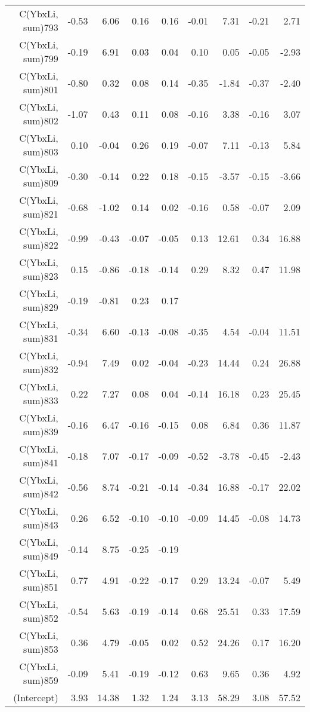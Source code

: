 \begin{table}[p]
\begin{tabular}{rrrrrrrrr}
  C(YbxLi, sum)793 & -0.53 & 6.06 & 0.16 & 0.16 & -0.01 & 7.31 & -0.21 & 2.71 \\ 
  C(YbxLi, sum)799 & -0.19 & 6.91 & 0.03 & 0.04 & 0.10 & 0.05 & -0.05 & -2.93 \\ 
  C(YbxLi, sum)801 & -0.80 & 0.32 & 0.08 & 0.14 & -0.35 & -1.84 & -0.37 & -2.40 \\ 
  C(YbxLi, sum)802 & -1.07 & 0.43 & 0.11 & 0.08 & -0.16 & 3.38 & -0.16 & 3.07 \\ 
  C(YbxLi, sum)803 & 0.10 & -0.04 & 0.26 & 0.19 & -0.07 & 7.11 & -0.13 & 5.84 \\ 
  C(YbxLi, sum)809 & -0.30 & -0.14 & 0.22 & 0.18 & -0.15 & -3.57 & -0.15 & -3.66 \\ 
  C(YbxLi, sum)821 & -0.68 & -1.02 & 0.14 & 0.02 & -0.16 & 0.58 & -0.07 & 2.09 \\ 
  C(YbxLi, sum)822 & -0.99 & -0.43 & -0.07 & -0.05 & 0.13 & 12.61 & 0.34 & 16.88 \\ 
  C(YbxLi, sum)823 & 0.15 & -0.86 & -0.18 & -0.14 & 0.29 & 8.32 & 0.47 & 11.98 \\ 
  C(YbxLi, sum)829 & -0.19 & -0.81 & 0.23 & 0.17 &  &  &  &  \\ 
  C(YbxLi, sum)831 & -0.34 & 6.60 & -0.13 & -0.08 & -0.35 & 4.54 & -0.04 & 11.51 \\ 
  C(YbxLi, sum)832 & -0.94 & 7.49 & 0.02 & -0.04 & -0.23 & 14.44 & 0.24 & 26.88 \\ 
  C(YbxLi, sum)833 & 0.22 & 7.27 & 0.08 & 0.04 & -0.14 & 16.18 & 0.23 & 25.45 \\ 
  C(YbxLi, sum)839 & -0.16 & 6.47 & -0.16 & -0.15 & 0.08 & 6.84 & 0.36 & 11.87 \\ 
  C(YbxLi, sum)841 & -0.18 & 7.07 & -0.17 & -0.09 & -0.52 & -3.78 & -0.45 & -2.43 \\ 
  C(YbxLi, sum)842 & -0.56 & 8.74 & -0.21 & -0.14 & -0.34 & 16.88 & -0.17 & 22.02 \\ 
  C(YbxLi, sum)843 & 0.26 & 6.52 & -0.10 & -0.10 & -0.09 & 14.45 & -0.08 & 14.73 \\ 
  C(YbxLi, sum)849 & -0.14 & 8.75 & -0.25 & -0.19 &  &  &  &  \\ 
  C(YbxLi, sum)851 & 0.77 & 4.91 & -0.22 & -0.17 & 0.29 & 13.24 & -0.07 & 5.49 \\ 
  C(YbxLi, sum)852 & -0.54 & 5.63 & -0.19 & -0.14 & 0.68 & 25.51 & 0.33 & 17.59 \\ 
  C(YbxLi, sum)853 & 0.36 & 4.79 & -0.05 & 0.02 & 0.52 & 24.26 & 0.17 & 16.20 \\ 
  C(YbxLi, sum)859 & -0.09 & 5.41 & -0.19 & -0.12 & 0.63 & 9.65 & 0.36 & 4.92 \\ 
  (Intercept) & 3.93 & 14.38 & 1.32 & 1.24 & 3.13 & 58.29 & 3.08 & 57.52 \\ 
   \hline
\end{tabular}
\end{table}
